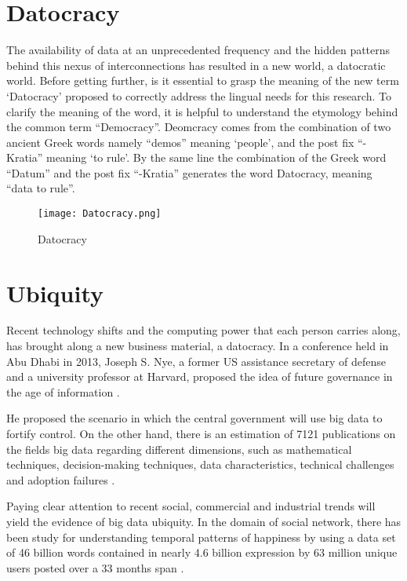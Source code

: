 \section{Datocracy}

The availability of data at an unprecedented frequency and the hidden patterns behind this nexus of interconnections has resulted in a new world, a datocratic world. Before getting further, is it essential to grasp the meaning of the new term ‘Datocracy’ proposed to correctly address the lingual needs for this research. To clarify the meaning of the word, it is helpful to understand the etymology behind the common term “Democracy”. Deomcracy comes from the combination of two ancient Greek words namely “demos” meaning ‘people’, and the post fix “-Kratia” meaning ‘to rule’. By the same line the combination of the Greek word “Datum” and the post fix “-Kratia” generates the word Datocracy, meaning “data to rule”.


\begin{figure}[h!]
    \centering
    \texttt{[image: Datocracy.png]}
    \caption{Datocracy}
    \label{fig:datocracy}
\end{figure}


\section{Ubiquity}

Recent technology shifts and the computing power that each person carries along, has brought along a new business material, a datocracy. In a conference held in Abu Dhabi in 2013, Joseph S. Nye, a former US assistance secretary of defense and a university professor at Harvard, proposed the idea of future governance in the age of information \cite{Nye2013}.

He proposed the scenario in which the central government will use big data to fortify control. On the other hand, there is an estimation of 7121 publications on the fields big data regarding different dimensions, such as mathematical techniques, decision-making techniques, data characteristics, technical challenges and adoption failures \cite{Wang2016}.

Paying clear attention to recent social, commercial and industrial trends will yield the evidence of big data ubiquity. In the domain of social network, there has been study for understanding temporal patterns of happiness by using a data set of 46 billion words contained in nearly 4.6 billion expression by 63 million unique users posted over a 33 months span \cite{Dodds2011}.

